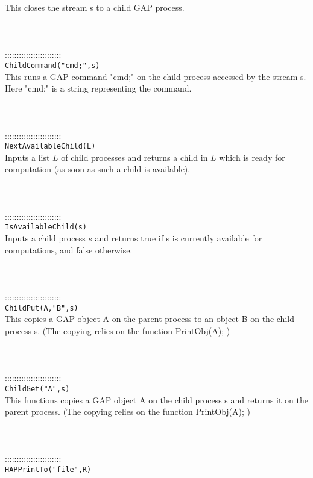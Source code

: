 \documentclass[a4paper,11pt]{report}
\begin{document}
{ This closes the stream s to a child GAP process. \\
 \\
 \\
 \\
 ::::::::::::::::::::::::\\
 \texttt{ChildCommand("cmd;",s)}\\
 

 This runs a GAP command "cmd;" on the child process accessed by the stream s.
Here "cmd;" is a string representing the command. \\
 \\
 \\
 \\
 ::::::::::::::::::::::::\\
 \texttt{NextAvailableChild(L)}\\
 

 Inputs a list $L$ of child processes and returns a child in $L$ which is ready for computation (as soon as such a child is available). \\
 \\
 \\
 \\
 ::::::::::::::::::::::::\\
 \texttt{IsAvailableChild(s)}\\
 

 Inputs a child process $s$ and returns true if s is currently available for computations, and false
otherwise. \\
 \\
 \\
 \\
 ::::::::::::::::::::::::\\
 \texttt{ChildPut(A,"B",s)}\\
 

 This copies a GAP object A on the parent process to an object B on the child
process s. (The copying relies on the function PrintObj(A); ) \\
 \\
 \\
 \\
 ::::::::::::::::::::::::\\
 \texttt{ChildGet("A",s)}\\
 

 This functions copies a GAP object A on the child process s and returns it on
the parent process. (The copying relies on the function PrintObj(A); ) \\
 \\
 \\
 \\
 ::::::::::::::::::::::::\\
 \texttt{HAPPrintTo("file",R)}\\
 

}
\end{document}
